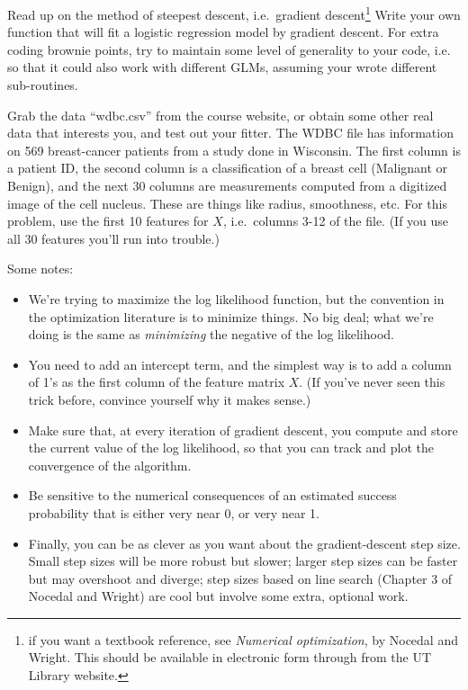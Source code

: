 \documentclass[11pt]{article}
\begin{document}
\begin{enumerate}[(A)]
Read up on the method of steepest descent, i.e.~gradient descent\footnote{if you want a textbook reference, see \textit{Numerical optimization}, by Nocedal and Wright. This should be available in electronic form through from the UT Library website.}  Write your own function that will fit a logistic regression model by gradient descent.  For extra coding brownie points, try to maintain some level of generality to your code, i.e. so that it could also work with different GLMs, assuming your wrote different sub-routines.  

Grab the data ``wdbc.csv'' from the course website, or obtain some other real data that interests you, and test out your fitter.  The WDBC file has information on 569 breast-cancer patients from a study done in Wisconsin.  The first column is a patient ID, the second column is a classification of a breast cell (Malignant or Benign), and the next 30 columns are measurements computed from a digitized image of the cell nucleus.  These are things like radius, smoothness, etc.  For this problem, use the first 10 features for $X$, i.e.~columns 3-12 of the file.  (If you use all 30 features you'll run into trouble.) 

Some notes:
\begin{itemize}
\item We're trying to maximize the log likelihood function, but the convention in the optimization literature is to minimize things.  No big deal; what we're doing is the same as \textit{minimizing} the negative of the log likelihood.  
\item You need to add an intercept term, and the simplest way is to add a column of 1's as the first column of the feature matrix $X$.  (If you've never seen this trick before, convince yourself why it makes sense.)  
\item Make sure that, at every iteration of gradient descent, you compute and store the current value of the log likelihood, so that you can track and plot the convergence of the algorithm.
\item Be sensitive to the numerical consequences of an estimated success probability that is either very near 0, or very near 1.
\item Finally, you can be as clever as you want about the gradient-descent step size.  Small step sizes will be more robust but slower; larger step sizes can be faster but may overshoot and diverge; step sizes based on line search (Chapter 3 of Nocedal and Wright) are cool but involve some extra, optional work.
\end{itemize}


\end{enumerate}
\end{document}

